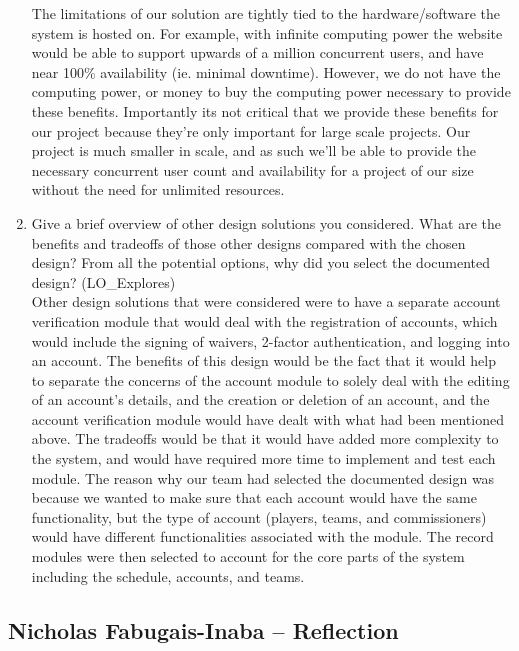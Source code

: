 \documentclass[12pt, titlepage]{article}
\begin{document}
\begin{enumerate}
    The limitations of our solution are tightly tied to the hardware/software 
    the system is hosted on. For example, with infinite computing power the 
    website would be able to support upwards of a million concurrent users, 
    and have near 100\% availability (ie. minimal downtime). However, we do not
    have the computing power, or money to buy the computing power necessary to
    provide these benefits. Importantly its not critical that we provide these
    benefits for our project because they're only important for large scale
    projects. Our project is much smaller in scale, and as such we'll be able 
    to provide the necessary concurrent user count and availability for a 
    project of our size without the need for unlimited resources.
    
    \item Give a brief overview of other design solutions you considered. What
    are the benefits and tradeoffs of those other designs compared with the chosen
    design?  From all the potential options, why did you select the documented design?
    (LO\_Explores)\\

    Other design solutions that were considered were to have a separate account verification module
    that would deal with the registration of accounts, which would include the signing of waivers,
    2-factor authentication, and logging into an account. The benefits of this design would be the
    fact that it would help to separate the concerns of the account module to solely deal with the
    editing of an account's details, and the creation or deletion of an account, and the account
    verification module would have dealt with what had been mentioned above. The tradeoffs would
    be that it would have added more complexity to the system, and would have required more time
    to implement and test each module. The reason why our team had selected the documented design
    was because we wanted to make sure that each account would have the same functionality, but
    the type of account (players, teams, and commissioners) would have different functionalities
    associated with the module. The record modules were then selected to account for the
    core parts of the system including the schedule, accounts, and teams.

\end{enumerate}

\subsection*{Nicholas Fabugais-Inaba -- Reflection}
\end{document}
